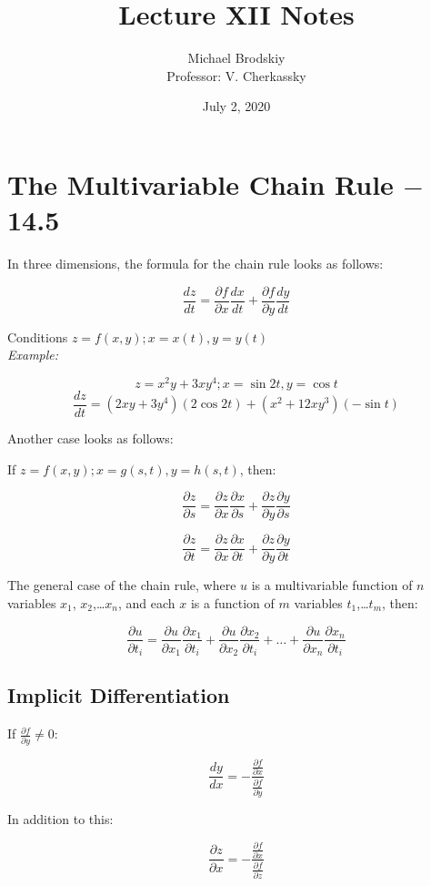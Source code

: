 \documentclass[12pt]{article}
\title{Lecture XII Notes}
\date{July 2, 2020}
\author{Michael Brodskiy\\ \small Professor: V. Cherkassky}
\begin{document}
\maketitle

\section{The Multivariable Chain Rule $-$ 14.5}

In three dimensions, the formula for the chain rule looks as follows:

$$\frac{dz}{dt}=\frac{\partial f}{\partial x}\frac{dx}{dt} + \frac{\partial f}{\partial y}\frac{dy}{dt}$$

Conditions $z=f(x,y); x=x(t), y=y(t)$\\

\textit{Example:}

$$z=x^2y+3xy^4; x=\sin2t,y=\cos t$$
$$\frac{dz}{dt}=(2xy+3y^4)(2\cos2t)+(x^2+12xy^3)(-\sin t)$$

Another case looks as follows:

If $z=f(x,y); x=g(s,t), y=h(s,t)$, then:

$$\frac{\partial z}{\partial s}=\frac{\partial z}{\partial x}\frac{\partial x}{\partial s} + \frac{\partial z}{\partial y}\frac{\partial y}{\partial s}$$

$$\frac{\partial z}{\partial t}=\frac{\partial z}{\partial x}\frac{\partial x}{\partial t} + \frac{\partial z}{\partial y}\frac{\partial y}{\partial t}$$

The general case of the chain rule, where $u$ is a multivariable function of $n$ variables $x_1$, $x_2$,\dots $x_n$, and each $x$ is a function of $m$ variables $t_1$,\dots$t_m$, then:

$$\frac{\partial u}{\partial t_i}=\frac{\partial u}{\partial x_1}\frac{\partial x_1}{\partial t_i}+\frac{\partial u}{\partial x_2}\frac{\partial x_2}{\partial t_i}+\dots+\frac{\partial u}{\partial x_n}\frac{\partial x_n}{\partial t_i}$$

\subsection{Implicit Differentiation}

If $\frac{\partial f}{\partial y}\neq 0$:

$$\frac{dy}{dx}=-\frac{\frac{\partial f}{\partial x}}{\frac{\partial f}{\partial y}}$$

In addition to this:

$$\frac{\partial z}{\partial x}=-\frac{\frac{\partial f}{\partial x}}{\frac{\partial f}{\partial z}}$$
\end{document}
